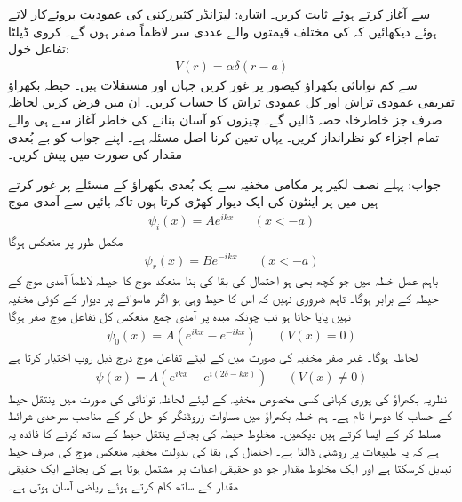 سے آغاز کرتے ہوئے  ثابت کریں۔ اشارہ: لیژانڈر کثیررکنی کی عمودیت بروئےکار لاتے ہوئے دیکھائیں کہ  کی مختلف قیمتوں والے عددی سر لاظماً صفر ہوں گے۔
کروی ڈیلٹا تفاعل خول:
\begin{align*}
	V(r) = \alpha\delta(r-a)
\end{align*}
سے کم توانائی بکھراؤ کیصور پر غور کریں جہاں  اور  مستقلات ہیں۔ حیطہ بکھراؤ  تفریقی عمودی تراش  اور کل عمودی تراش  کا حساب کریں۔ ان میں  فرض کریں لحاظہ صرف  جز خاطرخاہ حصہ ڈالیں گے۔ چیزوں کو آسان بنانے کی خاطر آغاز سے ہی  والے تمام اجزاء کو نظرانداز کریں۔ یہاں  تعین کرنا اصل مسئلہ ہے۔ اپنے جواب کو بے بُعدی مقدار  کی صورت میں پیش کریں۔

جواب: 	
پہلے نصف لکیر  پر مکامی مخفیہ  سے یک بُعدی بکھراؤ کے مسئلے پر غور کرتے ہیں  میں  پر اینٹون کی ایک دیوار کھڑی کرتا ہوں تاکہ بائیں سے آمدی موج 
\begin{align}
	\psi_i(x) = Ae^{ikx}&&(x<-a)
\end{align}
مکمل طور پر منعکس ہوگا
\begin{align}
	\psi_r(x) = Be^{-ikx}&&(x<-a)
\end{align}
باہم عمل خطہ  میں جو کچھ بھی ہو احتمال کی بقا کی بنا منعکد موج کا حیطہ لاظماً آمدی موج کے حیطہ کے برابر ہوگا۔ تاہم ضروری نہیں کہ اس کا حیط وہی ہو اگر ماسوائے  پر دیوار کے کوئی مخفیہ نہیں پایا جاتا ہو تب چونکہ مبدہ پر آمدی جمع منعکس کل تفاعل موج صفر ہوگا 
\begin{align}
	\psi_0(x) = A\left(e^{ikx}-e^{-ikx}\right)&&(V(x)=0)
\end{align}
لحاظہ  ہوگا۔ غیر صفر مخفیہ کی صورت میں  کے لیئے تفاعل موج درج ذیل روپ اختیار کرتا ہے
\begin{align}
	\psi(x) = A\left(e^{ikx}-e^{i(2\delta-kx)}\right)&&(V(x)\neq0)
\end{align}
نظریہ بکھراؤ کی پوری کہانی کسی مخصوص مخفیہ کے لیئے  لحاظہ توانائی  کی صورت میں ینتقل حیط کے حساب کا دوسرا نام ہے۔ ہم خطہ بکھراؤ  میں مساوات زروڈنگر کو حل کر کے مناصب سرحدی شرائط مسلط کر کے ایسا کرتے ہیں  دیکھیں۔ مخلوط حیطہ  کی بجائے ینتقل حیط کے ساتھ کرنے کا فائدہ یہ ہے کہ یہ طبیعات پر روشنی ڈالتا ہے۔ احتمال کی بقا کی بدولت مخفیہ منعکس موج کی صرف حیط تبدیل کرسکتا ہے اور ایک مخلوط مقدار جو دو حقیقی اعدات پر مشتمل ہوتا ہے کی بجائے ایک حقیقی مقدار کے ساتھ کام کرتے ہوئے ریاضی آسان ہوتی ہے۔

